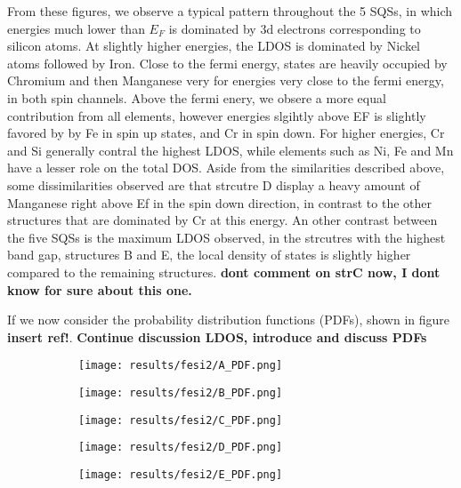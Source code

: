 From these figures, we observe a typical pattern throughout the 5 SQSs, in which energies much lower than $E_F$ is dominated by 3d electrons corresponding to silicon atoms. At slightly higher energies, the LDOS is dominated by Nickel atoms followed by Iron. Close to the fermi energy, states are heavily occupied by Chromium and then Manganese very for energies very close to the fermi energy, in both spin channels. Above the fermi enery, we obsere a more equal contribution from all elements, however energies slgihtly above EF is slightly favored by by Fe in spin up states, and Cr in spin down. For higher energies, Cr and Si generally contral the highest LDOS, while elements such as Ni, Fe and Mn have  a lesser role on the total DOS. Aside from the similarities described above, some dissimilarities observed are that strcutre D display a heavy amount of Manganese right above Ef in the spin down direction, in contrast to the other structures that are dominated by Cr at this energy. An other contrast between the five SQSs is the maximum LDOS observed, in the strcutres with the highest band gap, structures B and E, the local density of states is slightly higher compared to the remaining structures. \textbf{dont comment on strC now, I dont know for sure about this one.} 

If we now consider the probability distribution functions (PDFs), shown in figure \textbf{insert ref!}.  
\textbf{Continue discussion LDOS, introduce and discuss PDFs}

\begin{figure}[H]
\centering
	\begin{subfigure}{\textwidth}
		\texttt{[image: results/fesi2/A\_PDF.png]}
	\end{subfigure}	
	\begin{subfigure}{\textwidth}
		\texttt{[image: results/fesi2/B\_PDF.png]}
	\end{subfigure}
	\begin{subfigure}{\textwidth}
		\texttt{[image: results/fesi2/C\_PDF.png]}
	\end{subfigure}
\end{figure}
\begin{figure}[H]
\centering
	\begin{subfigure}{\textwidth}
		\texttt{[image: results/fesi2/D\_PDF.png]}
	\end{subfigure}
	\begin{subfigure}{\textwidth}
		\texttt{[image: results/fesi2/E\_PDF.png]}
	\end{subfigure}
\end{figure}

